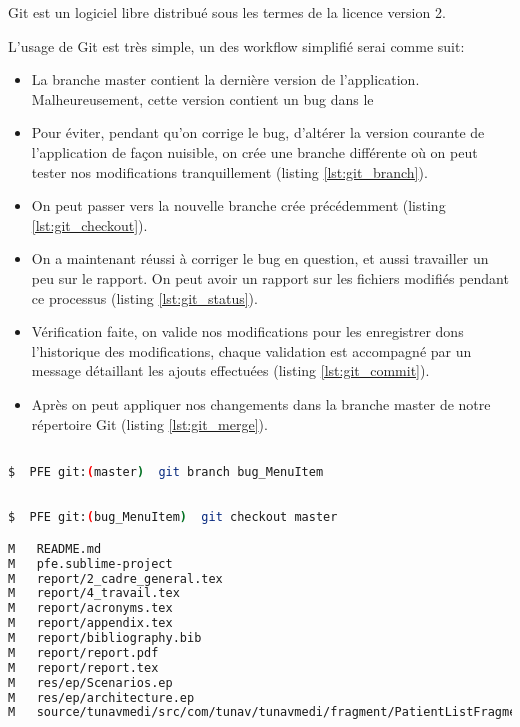Git est un logiciel libre distribué sous les termes de la licence   version 2.

L'usage de Git est très simple, un des workflow simplifié serai comme suit:

\begin{itemize}

\item La branche master contient la dernière version de l'application. Malheureusement, cette version contient un bug dans le 

\item Pour éviter, pendant qu'on corrige le bug, d'altérer la version courante de  l'application de façon nuisible, on crée une branche différente où on peut tester nos modifications tranquillement (listing \ref{lst:git_branch}).

\item On peut passer vers la nouvelle branche crée précédemment (listing \ref{lst:git_checkout}).

\item On a maintenant réussi à corriger le bug en question, et aussi travailler un peu sur le rapport. On peut avoir un rapport sur les fichiers modifiés pendant ce processus (listing \ref{lst:git_status}).

\item Vérification faite, on valide nos modifications pour les enregistrer dons l'historique des modifications, chaque validation est accompagné par un message détaillant les ajouts effectuées (listing \ref{lst:git_commit}).

\item Après on peut appliquer nos changements dans la branche master de notre répertoire Git (listing \ref{lst:git_merge}).

\end{itemize}

\begin{lstlisting}[language=bash, label=lst:git_branch, caption=Git Branch]

$  PFE git:(master)  git branch bug_MenuItem

\end{lstlisting}

\begin{lstlisting}[language=bash, label=lst:git_checkout, caption=Git checkout]

$  PFE git:(bug_MenuItem)  git checkout master

M   README.md
M   pfe.sublime-project
M   report/2_cadre_general.tex
M   report/4_travail.tex
M   report/acronyms.tex
M   report/appendix.tex
M   report/bibliography.bib
M   report/report.pdf
M   report/report.tex
M   res/ep/Scenarios.ep
M   res/ep/architecture.ep
M   source/tunavmedi/src/com/tunav/tunavmedi/fragment/PatientListFragment.java

\end{lstlisting}

